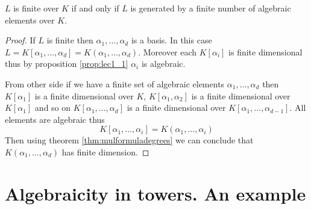 \begin{theorem}
  $L$ is finite over $K$ if and only if $L$ is generated by a finite
  number of algebraic elements over $K$.
  \begin{proof}
    If $L$ is finite then $\alpha_1, \dots, \alpha_d$ is a basis. In
    this case
    $L = K\left[\alpha_1, \dots, \alpha_d\right] = K\left(\alpha_1,
    \dots, \alpha_d\right)$. Moreover each
    $K\left[\alpha_i\right]$ is finite dimensional thus by
    proposition \ref{prop:lec1_1} $\alpha_i$ is algebraic.

    From other side if we have a finite set of algebraic elements
    $\alpha_1, \dots, \alpha_d$ then
    $K\left[\alpha_1\right]$ is a finite dimensional
     over $K$,
    $K\left[\alpha_1, \alpha_2\right]$ is a finite dimensional
     over $K\left[\alpha_1\right]$ and
    so on $K\left[\alpha_1, \dots, \alpha_d\right]$ is a finite dimensional
     over
    $K\left[\alpha_1, \dots, \alpha_{d-1}\right]$. All elements
    are algebraic thus
    \[
    K\left[\alpha_1, \dots, \alpha_i\right] =
    K\left(\alpha_1, \dots, \alpha_i\right)
    \]
    Then using theorem \ref{thm:mulformuladegrees} we can conclude
    that $K\left(\alpha_1, \dots, \alpha_d\right)$ has finite
    dimension. 
  \end{proof}
  \label{thm:lec1_2}
\end{theorem}

\section{Algebraicity in towers. An example}

